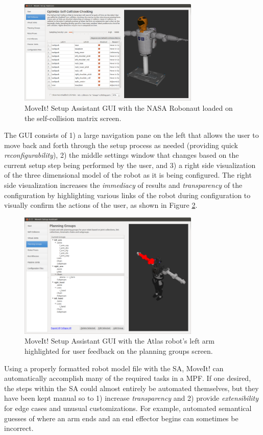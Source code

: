 \documentclass[10pt,journal,compsoc]{joser1}
\begin{document}
{\begin{figure}[!t]
\centering
\includegraphics[width=3.4in]{coleman_20131110_f06}
\caption{MoveIt! Setup Assistant GUI with the NASA Robonaut loaded on the
self-collision matrix screen.}
\label{fig:setupassistant}
\end{figure}

The GUI consists of 1) a large navigation pane on the left that allows the user
to move back and forth through the setup process as needed (providing quick
\textit{reconfigurability}), 2) the middle settings window that changes based on
the current setup step being performed by the user, and 3) a right side
visualization of the three dimensional model of the robot as it is being
configured. The right side visualization increases the \textit{immediacy} of
results and \textit{transparency} of the configuration by highlighting various
links of the robot during configuration to visually confirm the actions of the
user, as shown in Figure \ref{fig:setupassistant3}.

\begin{figure}[!t]
\centering
\includegraphics[width=3.4in]{coleman_20131110_f07}
\caption{MoveIt! Setup Assistant GUI with the Atlas robot's left arm highlighted
for user feedback on the planning groups screen.}
\label{fig:setupassistant3}	
\end{figure}

Using a properly formatted robot model file with the SA, MoveIt! can
automatically accomplish many of the required tasks in a MPF. If one desired,
the steps within the SA could almost entirely be automated themselves, but they
have been kept manual so to 1) increase \textit{transparency} and 2) provide
\textit{extensibility} for edge cases and unusual customizations. For example, automated semantical guesses of where an arm ends and an end effector begins can sometimes be incorrect.

}
\end{document}
